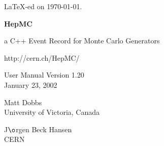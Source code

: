 \documentclass[11pt,letterpaper]{article}
\begin{document}
\newenvironment{fminipage}%
{\begin{Sbox}\begin{minipage}}%
{\end{minipage}\end{Sbox}\fbox{\TheSbox}}
%
%
%
\begin{titlepage}
{\tiny \LaTeX-ed on \today.}%

\vspace{3cm}

\begin{center}

{\Huge\bf HepMC}

\vspace{1cm}

{\huge a C++ Event Record for Monte Carlo Generators }

\vspace{2cm}

{http://cern.ch/HepMC/}

\vspace{1cm}

{\Large User Manual Version 1.20} \\
January 23, 2002

\vspace{3cm}

{\huge Matt Dobbs} \\
University of Victoria, Canada

\vspace{.5cm}

{\huge J$\o$rgen Beck Hansen} \\
CERN

\vspace{1cm}

\end{center}
\begin{abstract}
  The HepMC package is an object oriented event record written in C++
  for High Energy Physics Monte Carlo Generators.  Many extensions
  from HEPEVT, the Fortran HEP standard, are supported: the number of
  entries is unlimited, spin density matrices can be stored with each
  vertex, flow patterns (such as color) can be stored and traced,
  integers representing random number generator states can be stored,
  and an arbitrary number of event weights can be included.  Particles
  and vertices are kept separate in a graph structure, physically
  similar to a physics event.  The added information supports the
  modularisation of event generators.  The package has been kept as
  simple as possible with minimal internal/external dependencies.
  Event information is accessed by means of iterators supplied with
  the package. 
\end{abstract}
\end{titlepage}
\end{document}
